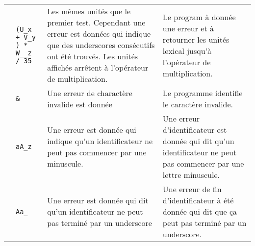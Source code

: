 \begin{center}
\begin{longtable}{cp{4cm}p{4cm}p{5cm}}
		\tid  &
    \verb|(U_x + V_y ) * W__z / 35| &
    Les mêmes unités que le premier test. Cependant une erreur est données
    qui indique que des underscores consécutifs ont été trouvés. Les unités
    affichés arrêtent à l’opérateur de multiplication. &
    Le program à donnée une erreur et à retourner les unités lexical jusqu’à
    l’opérateur de multiplication. \\

		\tid  &
    \verb|&| &
    Une erreur de charactère invalide est donnée &
    Le programme identifie le caractère invalide. \\

		\tid  &
    \verb|aA_z| &
    Une erreur est donnée qui indique qu’un identificateur ne peut pas
    commencer par une minuscule. &
    Une erreur d’identificateur est donnée qui dit qu’un identificateur ne
    peut pas commencer par une lettre minuscule. \\

		\tid  &
    \verb|Aa_| &
    Une erreur est donnée qui dit qu’un identificateur ne peut pas terminé
    par un underscore &
    Une erreur de fin d’identificateur à été donnée qui dit que ça peut pas
    terminé par un underscore.  \\
	\end{longtable}
\end{center}

